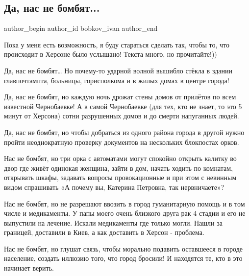  
 
 
 
 
 
\subsection{Да, нас не бомбят...}
\label{sec:04_05_2022.fb.bobkov_ivan.1.nas_ne_bombjat}
 
\ifcmt
 author_begin
   author_id bobkov_ivan
 author_end
\fi

Пока у меня есть возможность, я буду стараться сделать так, чтобы то, что
происходит в Херсоне было услышано! Текста много, но прочитайте!))

Да, нас не бомбят… Но почему-то ударной волной вышибло стёкла в здании
главпочтампта, больницы, горисполкома и в жилых домах в центре города!

Да, нас не бомбят, но каждую ночь дрожат стены домов от прилётов по всем
известной Чернобаевке! А в самой Чернобаевке (для тех, кто не знает, то это 5
минут от Херсона) сотни разрушенных домов и до смерти напуганных людей.   

Да, нас не бомбят, но чтобы добраться из одного района города в другой нужно
пройти неоднократную проверку документов на нескольких блокпостах орков. 

Нас не бомбят, но три орка с автоматами могут спокойно открыть калитку во двор
где живёт одинокая женщина, зайти в дом, начать ходить по комнатам, открывать
шкафы, задавать вопросы провокационные и при этом с невинным видом спрашивать
«А почему вы, Катерина Петровна, так нервничаете»?

Нас не бомбят, но не разрешают ввозить в город гуманитарную помощь и в том
числе и медикаменты. У папы моего очень близкого друга рак 4 стадии и его не
выпустили на лечение. Искали медикаменты где только могли. Нашли за границей,
доставили в Киев, а как доставить в Херсон - проблема. 


Нас не бомбят, но глушат связь, чтобы морально подавить оставшееся в городе
население, создать иллюзию того, что город бросили! И находятся те, кто в это
начинает верить. 

